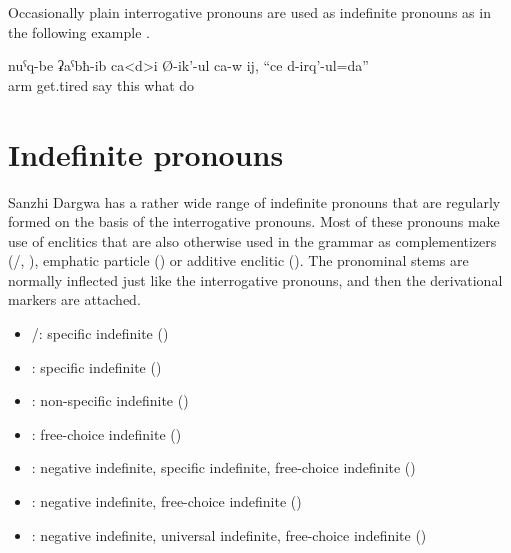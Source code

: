 Occasionally plain interrogative pronouns are used as indefinite pronouns as in the following example .
%
\begin{exe}
	\ex	\label{ex:He says, my hands got tired, I do something}
	\gll	nuˁq-be	ʡaˁbħ-ib ca<d>i	Ø-ik'-ul ca-w	ij,	``ce	d-irq'-ul=da''\\
		arm	get.tired 	say 	this	what	do\\
	\glt	{}
\end{exe}



\section{Indefinite pronouns}
\label{sec:Indefinite pronouns}

Sanzhi Dargwa has a rather wide range of indefinite pronouns that are regularly formed on the basis of the interrogative pronouns. Most of these pronouns make use of enclitics that are also otherwise used in the grammar as complementizers (\slash{}, ), emphatic particle () or additive enclitic (). The pronominal stems are normally inflected just like the interrogative pronouns, and then the derivational markers are attached.
%
\begin{itemize}
	\item	{}\slash{}: specific indefinite ()
		\item	{}: specific indefinite ()
	\item	{}: non-specific indefinite ()
	\item	{}: free-choice indefinite ()
	\item	{}: negative indefinite, specific indefinite, free-choice indefinite ()
		\item	{}: negative indefinite, free-choice indefinite ()
	\item	{}: negative indefinite, universal indefinite, free-choice indefinite ()
\end{itemize}


